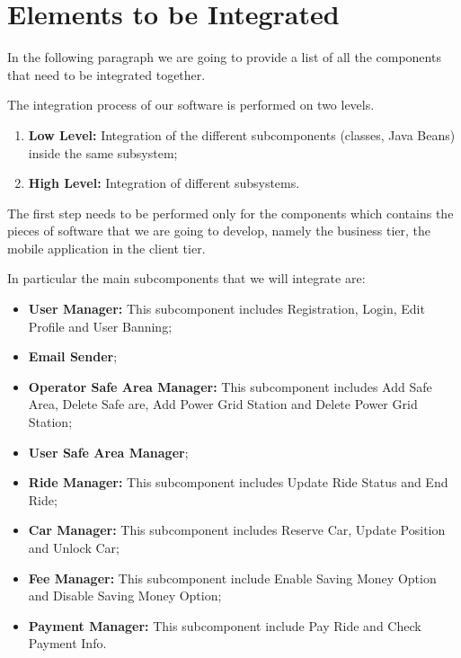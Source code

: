\section{Elements to be Integrated}
In the following paragraph we are going to provide a list of all the components that need to be integrated together.

The integration process of our software is performed on two levels.
\begin{enumerate}
\item \textbf{Low Level:} Integration of the different subcomponents (classes, Java Beans) inside the
same subsystem;
\item \textbf{High Level:} Integration of different subsystems.
\end{enumerate}

The first step needs to be performed only for the components which contains
the pieces of software that we are going to develop, namely the business
tier, the mobile application in the client tier.

In particular the main subcomponents that we will integrate are:
\begin{itemize}
\item \textbf{User Manager:} This subcomponent includes Registration, Login, Edit Profile and User Banning;
\item \textbf{Email Sender};
\item \textbf{Operator Safe Area Manager:} This subcomponent includes Add Safe Area, Delete Safe are, Add Power Grid Station and Delete Power Grid Station;
\item \textbf{User Safe Area Manager};
\item \textbf{Ride Manager:} This subcomponent includes Update Ride Status and End Ride;
\item \textbf{Car Manager:} This subcomponent includes Reserve Car, Update Position and Unlock Car;
\item \textbf{Fee Manager:} This subcomponent include Enable Saving Money Option and Disable Saving Money Option;
\item \textbf{Payment Manager:} This subcomponent include Pay Ride and Check Payment Info.
\end{itemize}


